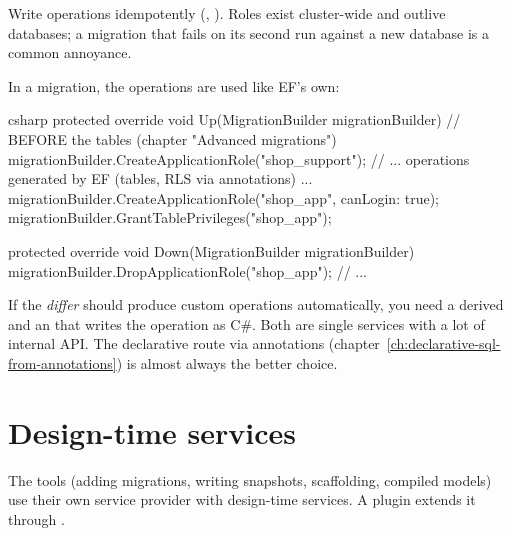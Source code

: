 \begin{tip}
  Write operations idempotently (, ). Roles exist cluster-wide and
  outlive databases; a migration that fails on its second run against a new database is a
  common annoyance.
\end{tip}

In a migration, the operations are used like EF's own:

\begin{sourcecode}{csharp}
protected override void Up(MigrationBuilder migrationBuilder)
{
    // BEFORE the tables (chapter "Advanced migrations")
    migrationBuilder.CreateApplicationRole("shop_support");
    // ... operations generated by EF (tables, RLS via annotations) ...
    migrationBuilder.CreateApplicationRole("shop_app", canLogin: true);
    migrationBuilder.GrantTablePrivileges("shop_app");
}

protected override void Down(MigrationBuilder migrationBuilder)
{
    migrationBuilder.DropApplicationRole("shop_app");
    // ...
}
\end{sourcecode}

\begin{note}
  If the \emph{differ} should produce custom operations automatically, you need a derived
   and an
   that
  writes the operation as C\#. Both are single services with a lot of internal API. The
  declarative route via annotations (chapter~\ref{ch:declarative-sql-from-annotations}) is
  almost always the better choice.
\end{note}

\chapter{Design-time services}\label{ch:design-time-services}

The  tools (adding migrations, writing snapshots, scaffolding, compiled
models) use their own service provider with design-time services. A plugin extends it
through .

